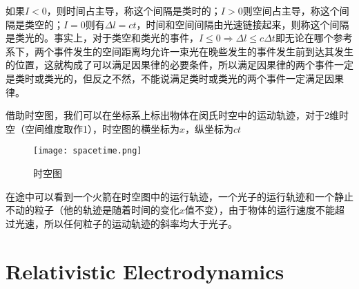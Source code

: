 \documentclass[14pt,oneside]{book}
\begin{document}
\begin{large}
如果$I<0$，则时间占主导，称这个间隔是类时的；$I>0$则空间占主导，称这个间隔是类空的；$I=0$则有$\Delta l=ct$，时间和空间间隔由光速链接起来，则称这个间隔是类光的。事实上，对于类空和类光的事件，$I\leq 0\Rightarrow\Delta l\leq c\Delta t$即无论在哪个参考系下，两个事件发生的空间距离均允许一束光在晚些发生的事件发生前到达其发生的位置，这就构成了可以满足因果律的必要条件，所以满足因果律的两个事件一定是类时或类光的，但反之不然，不能说满足类时或类光的两个事件一定满足因果律。

借助时空图，我们可以在坐标系上标出物体在闵氏时空中的运动轨迹，对于$2$维时空（空间维度取作1），时空图的横坐标为$x$，纵坐标为$ct$
\begin{figure}[H]
\centering
  \texttt{[image: spacetime.png]}
  \caption{时空图}
\end{figure}
在途中可以看到一个火箭在时空图中的运行轨迹，一个光子的运行轨迹和一个静止不动的粒子（他的轨迹是随着时间的变化$x$值不变），由于物体的运行速度不能超过光速，所以任何粒子的运动轨迹的斜率均大于光子。

\section{Relativistic Electrodynamics}

\end{large}
\end{document}
